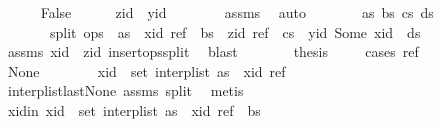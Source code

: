 \begin{isabellebody}
\isanewline
\ \ \ \ \isamarkupfalse%
\ False\isanewline
\ \ \ \ \isamarkupfalse%
\ {\isachardoublequoteopen}zid\ {\isacharless}\ yid{\isachardoublequoteclose}\isanewline
\ \ \ \ \ \ \isamarkupfalse%
\ assms{\isacharparenleft}{}{\isacharparenright}\ \isamarkupfalse%
\ auto\isanewline
\ \ \ \ \isamarkupfalse%
\ \isamarkupfalse%
\ as\ bs\ cs\ ds\isanewline
\ \ \ \ \ \ \ split{\isacharcolon}\ {\isachardoublequoteopen}ops\ {\isacharequal}\ as\ {\isacharat}\ {\isacharbrackleft}{\isacharparenleft}xid{\isacharcomma}\ ref{\isacharparenright}{\isacharbrackright}\ {\isacharat}\ bs\ {\isacharat}\ {\isacharbrackleft}{\isacharparenleft}zid{\isacharcomma}\ ref{\isacharparenright}{\isacharbrackright}\ {\isacharat}\ cs\ {\isacharat}\ {\isacharbrackleft}{\isacharparenleft}yid{\isacharcomma}\ Some\ xid{\isacharparenright}{\isacharbrackright}\ {\isacharat}\ ds{\isachardoublequoteclose}\isanewline
\ \ \ \ \ \ \isamarkupfalse%
\ assms\ {\isacartoucheopen}xid\ {\isacharless}\ zid{\isacartoucheclose}\ insert{\isacharunderscore}ops{\isacharunderscore}split{\isacharunderscore}{}\ \isamarkupfalse%
\ blast\isanewline
\ \ \ \ \isamarkupfalse%
\ \isamarkupfalse%
\ {\isacharquery}thesis\isanewline
\ \ \ \ \isamarkupfalse%
{\isacharparenleft}cases\ ref{\isacharparenright}\isanewline
\ \ \ \ \ \ \isamarkupfalse%
\ None\isanewline
\ \ \ \ \ \ \isamarkupfalse%
\ {\isachardoublequoteopen}xid\ {\isasymin}\ set\ {\isacharparenleft}interp{\isacharunderscore}list\ {\isacharparenleft}as\ {\isacharat}\ {\isacharbrackleft}{\isacharparenleft}xid{\isacharcomma}\ ref{\isacharparenright}{\isacharbrackright}{\isacharparenright}{\isacharparenright}{\isachardoublequoteclose}\isanewline
\ \ \ \ \ \ \ \ \isamarkupfalse%
\ interp{\isacharunderscore}list{\isacharunderscore}last{\isacharunderscore}None\ assms{\isacharparenleft}{}{\isacharparenright}\ split\ \isamarkupfalse%
\ metis\isanewline
\ \ \ \ \ \ \isamarkupfalse%
\ xid{\isacharunderscore}in{\isacharcolon}\ {\isachardoublequoteopen}xid\ {\isasymin}\ set\ {\isacharparenleft}interp{\isacharunderscore}list\ {\isacharparenleft}as\ {\isacharat}\ {\isacharbrackleft}{\isacharparenleft}xid{\isacharcomma}\ ref{\isacharparenright}{\isacharbrackright}\ {\isacharat}\ bs{\isacharparenright}{\isacharparenright}{\isachardoublequoteclose}\isanewline

\end{isabellebody}
